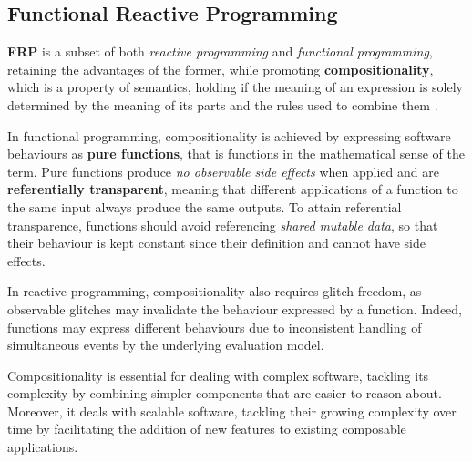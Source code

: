 
\subsection{Functional Reactive Programming}
\label{section:background:concepts:frp}

\textbf{\ac{FRP}} is a subset of both \textit{reactive programming} and
\textit{functional programming}, retaining the advantages of the former,
while promoting \textbf{compositionality}, which is a property of semantics,
holding if the meaning of an expression is solely determined by the meaning of
its parts and the rules used to combine them \cite{FRP}.

In functional programming, compositionality is achieved by expressing software
behaviours as \textbf{pure functions}, that is functions in the mathematical
sense of the term. Pure functions produce \textit{no observable side effects}
when applied and are \textbf{referentially transparent}, meaning that different
applications of a function to the same input always produce the same outputs.
To attain referential transparence, functions should avoid referencing
\textit{shared mutable data}, so that their behaviour is kept constant since
their definition and cannot have side effects.

In reactive programming, compositionality also requires glitch freedom, as
observable glitches may invalidate the behaviour expressed by a function.
Indeed, functions may express different behaviours due to inconsistent handling
of simultaneous events by the underlying evaluation model.

Compositionality is essential for dealing with complex software, tackling its
complexity by combining simpler components that are easier to reason about.
Moreover, it deals with scalable software, tackling their growing complexity
over time by facilitating the addition of new features to existing composable
applications.

